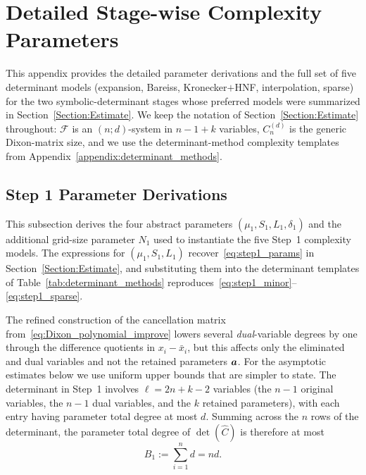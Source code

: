 \newpage
\section{Detailed Stage-wise Complexity Parameters}\label{appendix:stage_details}

This appendix provides the detailed parameter derivations and the full set of five determinant models (expansion, Bareiss, Kronecker$+$HNF, interpolation, sparse) for the two symbolic-determinant stages whose preferred models were summarized in Section~\ref{Section:Estimate}. We keep the notation of Section~\ref{Section:Estimate} throughout: $\mathcal{F}$ is an $(n;d)$-system in $n-1+k$ variables, $C_n^{(d)}$ is the generic Dixon-matrix size, and we use the determinant-method complexity templates from Appendix~\ref{appendix:determinant_methods}.

\subsection{Step 1 Parameter Derivations}\label{appendix:step1}

This subsection derives the four abstract parameters $(\mu_1,S_1,L_1,\delta_1)$ and the additional grid-size parameter $N_1$ used to instantiate the five Step~1 complexity models. The expressions for $(\mu_1,S_1,L_1)$ recover~\eqref{eq:step1_params} in Section~\ref{Section:Estimate}, and substituting them into the determinant templates of Table~\ref{tab:determinant_methods} reproduces~\eqref{eq:step1_minor}--\eqref{eq:step1_sparse}.

The refined construction of the cancellation matrix from~\eqref{eq:Dixon_polynomial_improve} lowers several \emph{dual}-variable degrees by one through the difference quotients in $x_i-\bar{x}_i$, but this affects only the eliminated and dual variables and not the retained parameters ${\boldsymbol{a}}$. For the asymptotic estimates below we use uniform upper bounds that are simpler to state. The determinant in Step~1 involves $\ell=2n+k-2$ variables (the $n-1$ original variables, the $n-1$ dual variables, and the $k$ retained parameters), with each entry having parameter total degree at most $d$. Summing across the $n$ rows of the determinant, the parameter total degree of $\det(\widehat{C})$ is therefore at most
\[
B_1 := \sum_{i=1}^{n} d = nd.
\]

